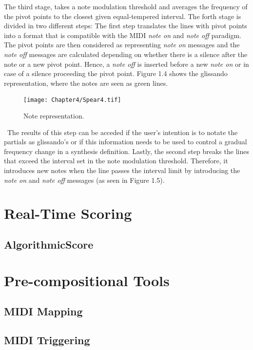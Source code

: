The third stage, takes a note modulation threshold and averages the frequency of the pivot points to the closest given equal-tempered interval. 
The forth stage is divided in two different steps: The first step translates the lines with pivot points into a format that is compatible with the MIDI \emph{note on} and \emph{note off} paradigm. The pivot points are then considered as representing \emph{note on} messages and the \emph{note off} messages are calculated depending on whether there is a silence after the note or a new pivot point. Hence, a \emph{note off} is inserted before a new \emph{note on} or in case of a silence proceeding the pivot point. Figure 1.4 shows the glissando representation, where the notes are seen as green lines. 
\begin{figure}[htbp] %
   \centering
   \texttt{[image: Chapter4/Spear4.tif]} %
   \caption{Note representation.}
   \label{fig:example}
\end{figure}\
The results of this step can be acceded if the user's intention is to notate the partials as glissando's or if this information needs to be used to control a gradual frequency change in a synthesis definition. Lastly, the second step breaks the lines that exceed the interval set in the note modulation threshold. Therefore, it introduces new notes when the line passes the interval limit by introducing the \emph{note on} and \emph{note off} messages (as seen in Figure 1.5).


\section{Real-Time Scoring}
\subsection{AlgorithmicScore}

\section{Pre-compositional Tools}
\subsection{MIDI Mapping}
\subsection{MIDI Triggering}

\label{ch:compamp}